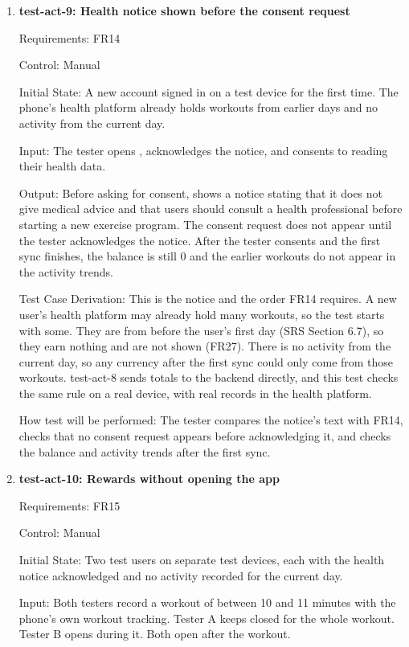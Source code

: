 \documentclass[12pt, titlepage]{article}
\begin{document}
\begin{enumerate}
\item{\textbf{test-act-9: Health notice shown before the consent request}\\}

Requirements: FR14

Control: Manual

Initial State: A new account signed in on a test device for the first time.
The phone's health platform already holds workouts from earlier days and no
activity from the current day.

Input: The tester opens \progname{}, acknowledges the notice, and consents to
\progname{} reading their health data.

Output: Before asking for consent, \progname{} shows a notice stating that it
does not give medical advice and that users should consult a health
professional before starting a new exercise program. The consent request does
not appear until the tester acknowledges the notice. After the tester consents
and the first sync finishes, the balance is still 0 and the earlier workouts do
not appear in the activity trends.

Test Case Derivation: This is the notice and the order FR14 requires. A new
user's health platform may already hold many workouts, so the test starts with
some. They are from before the user's first day (SRS Section 6.7), so they earn
nothing and are not shown (FR27). There is no activity from the current day, so
any currency after the first sync could only come from those workouts.
test-act-8 sends totals to the backend directly, and this test checks the same
rule on a real device, with real records in the health platform.

How test will be performed: The tester compares the notice's text with FR14,
checks that no consent request appears before acknowledging it, and checks the
balance and activity trends after the first sync.

\item{\textbf{test-act-10: Rewards without opening the app}\\}

Requirements: FR15

Control: Manual

Initial State: Two test users on separate test devices, each with the health
notice acknowledged and no activity recorded for the current day.

Input: Both testers record a workout of between 10 and 11 minutes with the
phone's own workout tracking. Tester A keeps \progname{} closed for the whole
workout. Tester B opens \progname{} during it. Both open \progname{} after
the workout.


\end{enumerate}
\end{document}
